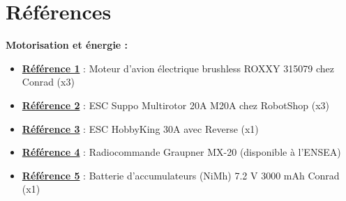 \documentclass[a4paper,11pt]{report}
\begin{document}
				
\chapter{Références}

				\textbf{Motorisation et énergie :}
				\begin{itemize}
							\item \textbf{\href{http://www.conrad.fr/ce/fr/product/231891/Moteur-davion-lectrique-brushless-ROXXY-315079?ref=searchDetail}{Référence 1}} : Moteur d'avion électrique brushless ROXXY 315079 chez Conrad (x3)
							\item \textbf{\href{https://www.robotshop.com/eu/fr/esc-multirotor-20a-m20a.html}{Référence 2}} : ESC Suppo Multirotor 20A M20A chez RobotShop (x3)
							\item \textbf{\href{https://hobbyking.com/fr_fr/hobbykingr-tm-brushless-car-esc-30a-w-reverse.html}{Référence 3}} : ESC HobbyKing 30A avec Reverse (x1)
							\item \textbf{\href{https://www.topmodel.fr/product-detail-18656-graupner-mx-20-hott-12160?lang=fr}{Référence 4}} : Radiocommande Graupner MX-20 (disponible à l'ENSEA)
							\item \textbf{\href{http://www.conrad.fr/ce/fr/product/206028/Batterie-daccumulateurs-NiMh-72-V-3000-mAh-Conrad-energy-206028-stick-fiche-Tamiya-mle?ref=searchDetail}{Référence 5}} : Batterie d'accumulateurs (NiMh) 7.2 V 3000 mAh Conrad (x1)
				\end{itemize}
\end{document}
